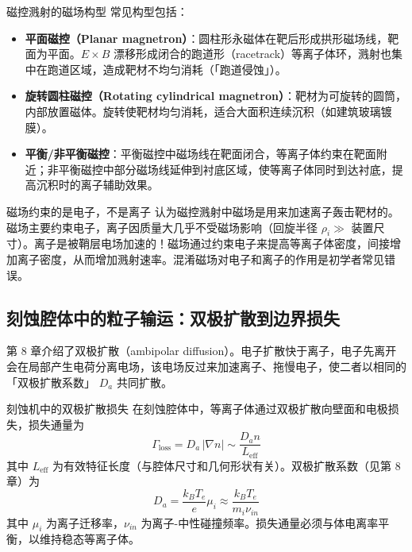 \documentclass[12pt,a4paper,openany,oneside]{book}
\begin{document}
\begin{definition}{磁控溅射的磁场构型}{}{}
\label{def:magnetron-config}
常见构型包括：
\begin{itemize}
\item \textbf{平面磁控（Planar magnetron）}：圆柱形永磁体在靶后形成拱形磁场线，靶面为平面。$E\times B$ 漂移形成闭合的跑道形（racetrack）等离子体环，溅射也集中在跑道区域，造成靶材不均匀消耗（「跑道侵蚀」）。
\item \textbf{旋转圆柱磁控（Rotating cylindrical magnetron）}：靶材为可旋转的圆筒，内部放置磁体。旋转使靶材均匀消耗，适合大面积连续沉积（如建筑玻璃镀膜）。
\item \textbf{平衡/非平衡磁控}：平衡磁控中磁场线在靶面闭合，等离子体约束在靶面附近；非平衡磁控中部分磁场线延伸到衬底区域，使等离子体同时到达衬底，提高沉积时的离子辅助效果。
\end{itemize}
\end{definition}

\begin{warning}{磁场约束的是电子，不是离子}{}
认为磁控溅射中磁场是用来加速离子轰击靶材的。磁场主要约束电子，离子因质量大几乎不受磁场影响（回旋半径 $\rho_i \gg$ 装置尺寸）。离子是被鞘层电场加速的！磁场通过约束电子来提高等离子体密度，间接增加离子密度，从而增加溅射速率。混淆磁场对电子和离子的作用是初学者常见错误。
\end{warning}

\subsection{刻蚀腔体中的粒子输运：双极扩散到边界损失}

第 8 章介绍了双极扩散（ambipolar diffusion）。电子扩散快于离子，电子先离开会在局部产生电荷分离电场，该电场反过来加速离子、拖慢电子，使二者以相同的「双极扩散系数」 $D_a$ 共同扩散。

\begin{theorem}{刻蚀机中的双极扩散损失}{}{}
\label{thm:ambipolar-etcher}
在刻蚀腔体中，等离子体通过双极扩散向壁面和电极损失，损失通量为
\begin{equation}
\label{eq:ambipolar-loss}
\Gamma_{\text{loss}} = D_a \,|\nabla n| \sim \frac{D_a n}{L_{\text{eff}}}
\end{equation}
其中 $L_{\text{eff}}$ 为有效特征长度（与腔体尺寸和几何形状有关）。双极扩散系数（见第 8 章）为
\begin{equation}
D_a = \frac{k_B T_e}{e} \mu_i \approx \frac{k_B T_e}{m_i \nu_{in}}
\end{equation}
其中 $\mu_i$ 为离子迁移率，$\nu_{in}$ 为离子-中性碰撞频率。损失通量必须与体电离率平衡，以维持稳态等离子体。
\end{theorem}
\end{document}
